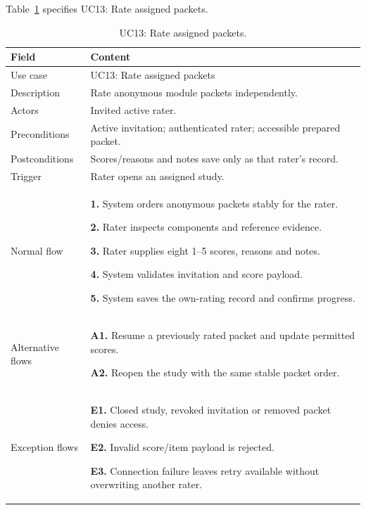 \needspace{.39\textheight}
Table~\ref{tab:uc-13} specifies UC13: Rate assigned packets.
\begin{table}[H]\centering\footnotesize{}\renewcommand{\arraystretch}{1.05}
\caption{UC13: Rate assigned packets.}\label{tab:uc-13}
\begin{tabular}{|p{2.8cm}|p{11.9cm}|}\hline
\textbf{Field} & \textbf{Content}\\\hline
Use case & UC13: Rate assigned packets\\\hline
Description & Rate anonymous module packets independently.\\\hline
Actors & Invited active rater.\\\hline
Preconditions & Active invitation; authenticated rater; accessible prepared packet.\\\hline
Postconditions & Scores/reasons and notes save only as that rater's record.\\\hline
Trigger & Rater opens an assigned study.\\\hline
Normal flow & \textbf{1.} System orders anonymous packets stably for the rater.\par \textbf{2.} Rater inspects components and reference evidence.\par \textbf{3.} Rater supplies eight 1--5 scores, reasons and notes.\par \textbf{4.} System validates invitation and score payload.\par \textbf{5.} System saves the own-rating record and confirms progress.\\\hline
Alternative flows & \textbf{A1.} Resume a previously rated packet and update permitted scores.\par \textbf{A2.} Reopen the study with the same stable packet order.\\\hline
Exception flows & \textbf{E1.} Closed study, revoked invitation or removed packet denies access.\par \textbf{E2.} Invalid score/item payload is rejected.\par \textbf{E3.} Connection failure leaves retry available without overwriting another rater.\\\hline
\end{tabular}\end{table}

